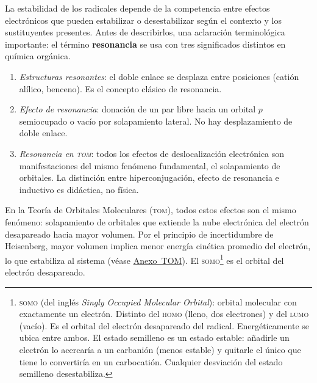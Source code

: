La estabilidad de los radicales depende de la competencia entre efectos electrónicos que pueden
estabilizar o desestabilizar según el contexto y los sustituyentes presentes. Antes de describirlos,
una aclaración terminológica importante: el término \textbf{resonancia} se usa con tres significados
distintos en química orgánica.
\begin{enumerate}
    \item \textit{Estructuras resonantes}: el doble enlace se desplaza entre posiciones (catión
    alílico, benceno). Es el concepto clásico de resonancia.
    \item \textit{Efecto de resonancia}: donación de un par libre hacia un orbital $p$ semiocupado
    o vacío por solapamiento lateral. No hay desplazamiento de doble enlace.
    \item \textit{Resonancia en \textsc{tom}}: todos los efectos de deslocalización electrónica
    son manifestaciones del mismo fenómeno fundamental, el solapamiento de orbitales. La distinción
    entre hiperconjugación, efecto de resonancia e inductivo es didáctica, no física.
\end{enumerate}

En la Teoría de Orbitales Moleculares (\textsc{tom}), todos estos efectos son el mismo fenómeno:
solapamiento de orbitales que extiende la nube electrónica del electrón desapareado hacia mayor
volumen. Por el principio de incertidumbre de Heisenberg, mayor volumen implica menor energía
cinética promedio del electrón, lo que estabiliza al sistema (véase
\hyperref[sec:anexo:tom]{Anexo~TOM}). El \textsc{somo}\footnote{\textsc{somo} (del inglés
\textit{Singly Occupied Molecular Orbital}): orbital molecular con exactamente un electrón. Distinto
del \textsc{homo} (lleno, dos electrones) y del \textsc{lumo} (vacío). Es el orbital del electrón
desapareado del radical. Energéticamente se ubica entre ambos. El estado semilleno es un estado
estable: añadirle un electrón lo acercaría a un carbanión (menos estable) y quitarle el único que
tiene lo convertiría en un carbocatión. Cualquier desviación del estado semilleno desestabiliza.} es
el orbital del electrón desapareado. \\

